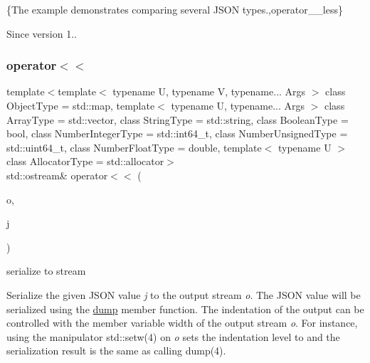 \{The example demonstrates comparing several J\+S\+ON types.,operator\+\_\+\+\_\+less\}

\begin{DoxySince}{Since}
version 1.. 
\end{DoxySince}
\hypertarget{classnlohmann_1_1basic__json_a5e34c5435e557d0bf666bd7311211405}{}\label{classnlohmann_1_1basic__json_a5e34c5435e557d0bf666bd7311211405} 
\subsubsection{\texorpdfstring{operator$<$$<$}{operator<<}\hspace{0.1cm}{\footnotesize\ttfamily [1/2]}}
{\footnotesize\ttfamily template$<$template$<$ typename U, typename V, typename... Args $>$ class Object\+Type = std\+::map, template$<$ typename U, typename... Args $>$ class Array\+Type = std\+::vector, class String\+Type  = std\+::string, class Boolean\+Type  = bool, class Number\+Integer\+Type  = std\+::int64\+\_\+t, class Number\+Unsigned\+Type  = std\+::uint64\+\_\+t, class Number\+Float\+Type  = double, template$<$ typename U $>$ class Allocator\+Type = std\+::allocator$>$ \\
std\+::ostream\& operator$<$$<$ (\begin{DoxyParamCaption}\item[{std\+::ostream \&}]{o,  }\item[{const \hyperlink{classnlohmann_1_1basic__json}{basic\+\_\+json}$<$ Object\+Type, Array\+Type, String\+Type, Boolean\+Type, Number\+Integer\+Type, Number\+Unsigned\+Type, Number\+Float\+Type, Allocator\+Type $>$ \&}]{j }\end{DoxyParamCaption})\hspace{0.3cm}{\ttfamily [friend]}}



serialize to stream 

Serialize the given J\+S\+ON value {\itshape j} to the output stream {\itshape o}. The J\+S\+ON value will be serialized using the \hyperlink{classnlohmann_1_1basic__json_afd4b7d7bcadc62da7c582fa36ba6805f}{dump} member function. The indentation of the output can be controlled with the member variable {\ttfamily width} of the output stream {\itshape o}. For instance, using the manipulator {\ttfamily std\+::setw(4)} on {\itshape o} sets the indentation level to {} and the serialization result is the same as calling {\ttfamily dump(4)}.

